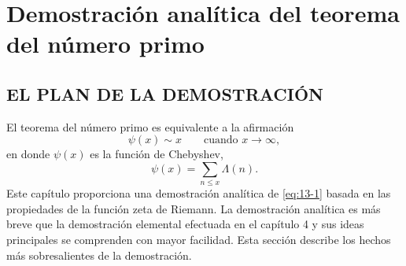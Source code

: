 \chapter{Demostración analítica del teorema del número primo}

    \section{EL PLAN DE LA DEMOSTRACIÓN}

    El teorema del número primo es equivalente a la afirmación
    \begin{equation}\label{eq:13-1}
        \psi(x)\sim x\qquad\text{cuando }x\to\infty,
    \end{equation}
    en donde $\psi(x)$ es la función de Chebyshev,
    \begin{equation*}
        \psi(x)=\sum_{n\leq x}\Lambda(n).
    \end{equation*}
    Este capítulo proporciona una demostración analítica de \eqref{eq:13-1} basada en las
    propiedades de la función zeta de Riemann. La demostración analítica es más breve que la
    demostración elemental efectuada en el capítulo 4 y sus ideas principales se comprenden
    con mayor facilidad. Esta sección describe los hechos más sobresalientes de la
    demostración.

